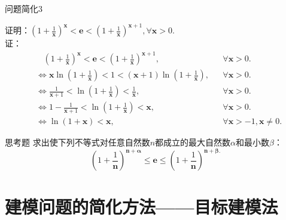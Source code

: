 \documentclass{beamer}
\begin{document}
\begin{frame}{问题简化3}
	\begin{spacing}{1.0}
		$
		\text{证明：}\left( 1+\frac{1}{\boldsymbol{x}} \right) ^{\boldsymbol{x}}<\boldsymbol{e}<\left( 1+\frac{1}{\boldsymbol{x}} \right) ^{\boldsymbol{x}+1},\forall \boldsymbol{x}>0.
		$\\
		证：
	\begin{equation*}
		\begin{aligned}
		&\ \ \ \ \left( 1+\frac{1}{\boldsymbol{x}} \right) ^{\boldsymbol{x}}<\boldsymbol{e}<\left( 1+\frac{1}{\boldsymbol{x}} \right) ^{\boldsymbol{x}+1},&&\forall \boldsymbol{x}>0.\\
		&\Leftrightarrow \boldsymbol{x}\ln \left( 1+\frac{1}{\boldsymbol{x}} \right) <1<\left( \boldsymbol{x}+1 \right) \ln \left( 1+\frac{1}{\boldsymbol{x}} \right),&& \forall \boldsymbol{x}>0.\\
		&\Leftrightarrow \frac{1}{\boldsymbol{x}+1}<\ln \left( 1+\frac{1}{\boldsymbol{x}} \right) <\frac{1}{\boldsymbol{x}},&&\forall \boldsymbol{x}>0.\\
		&\Leftrightarrow 1-\frac{1}{\boldsymbol{x}+1}<\ln \left( 1+\frac{1}{\boldsymbol{x}} \right) <\boldsymbol{x}, &&\forall \boldsymbol{x}>0.\\
		&\Leftrightarrow \ln \left( 1+\boldsymbol{x} \right) <\boldsymbol{x}, &&\forall \boldsymbol{x}>-1,\boldsymbol{x}\ne 0.
		\end{aligned}
	\end{equation*}
	\end{spacing}
\end{frame}

\begin{frame}{思考题}
		求出使下列不等式对任意自然数$n$都成立的最大自然数$\alpha$和最小数$\beta \text{：}$
		$$
		\left( 1+\frac{1}{\boldsymbol{n}} \right) ^{\boldsymbol{n}+\boldsymbol{\alpha }}\le \boldsymbol{e}\le \left( 1+\frac{1}{\boldsymbol{n}} \right) ^{\boldsymbol{n}+\boldsymbol{\beta }.}
		$$
\end{frame}

\section{建模问题的简化方法——目标建模法}
\end{document}
